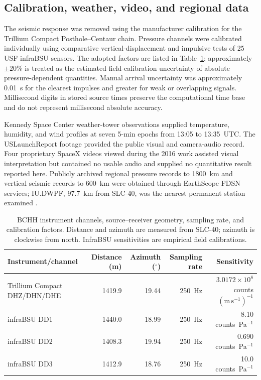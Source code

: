 \documentclass[]{seismica}
\begin{document}
\subsection{Calibration, weather, video, and regional data}

The seismic response was removed using the manufacturer calibration for the
Trillium Compact Posthole--Centaur chain. Pressure channels were calibrated
individually using comparative vertical-displacement and impulsive tests of 25
USF infraBSU sensors. The adopted factors are listed in
Table~\ref{tab:instrument_calibration}; approximately $\pm20\%$ is treated as
the estimated field-calibration uncertainty of absolute pressure-dependent
quantities. Manual arrival uncertainty was approximately 0.01~s for the
clearest impulses and greater for weak or overlapping signals. Millisecond
digits in stored source times preserve the computational time base and do not
represent millisecond absolute accuracy.

Kennedy Space Center weather-tower observations supplied temperature,
humidity, and wind profiles at seven 5-min epochs from 13:05 to 13:35~UTC.
The USLaunchReport footage provided the public visual and camera-audio record.
Four proprietary SpaceX videos viewed during the 2016 work assisted visual
interpretation but contained no usable audio and supplied no quantitative
result reported here. Publicly archived regional pressure records to 1800~km
and vertical seismic records to 600~km were obtained through EarthScope FDSN
services; IU.DWPF, 97.7~km from SLC-40, was the nearest permanent station
examined \citep{asl_gsn_iu_1988}.

\begin{table}[!tbp]
\centering
\caption{BCHH instrument channels, source--receiver geometry, sampling rate,
and calibration factors. Distance and azimuth are measured from SLC-40;
azimuth is clockwise from north. InfraBSU sensitivities are empirical field
calibrations.}
\label{tab:instrument_calibration}
\begin{tabular}{lrrrr}
\hline
Instrument/channel & Distance (m) & Azimuth ($^\circ$) & Sampling rate & Sensitivity \\
\hline
Trillium Compact DHZ/DHN/DHE & 1419.9 & 19.44 & 250~Hz
  & $3.0172\times10^8$ counts $(\mathrm{m\,s^{-1}})^{-1}$ \\
infraBSU DD1 & 1440.0 & 18.99 & 250~Hz & 8.10 counts~Pa$^{-1}$ \\
infraBSU DD2 & 1408.3 & 19.94 & 250~Hz & 0.690 counts~Pa$^{-1}$ \\
infraBSU DD3 & 1412.9 & 18.76 & 250~Hz & 10.0 counts~Pa$^{-1}$ \\
\hline
\end{tabular}
\end{table}
\FloatBarrier
\end{document}

